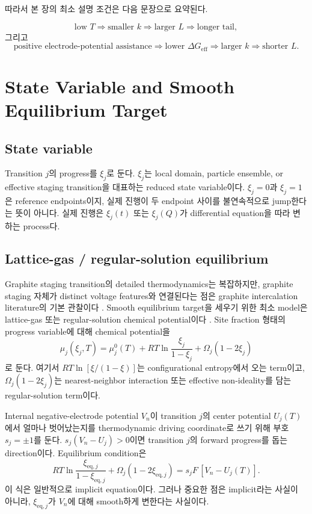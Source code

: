 \documentclass[11pt]{article}
\newcommand{\eq}{\mathrm{eq}}
\newcommand{\eff}{\mathrm{eff}}
\begin{document}
따라서 본 장의 최소 설명 조건은 다음 문장으로 요약된다.

\[
\text{low }T
\Rightarrow
\text{smaller }k
\Rightarrow
\text{larger }L
\Rightarrow
\text{longer tail},
\]
그리고
\[
\text{positive electrode-potential assistance}
\Rightarrow
\text{lower }\Delta G_{\eff}
\Rightarrow
\text{larger }k
\Rightarrow
\text{shorter }L.
\]

\section{State Variable and Smooth Equilibrium Target}\label{sec:equilibrium}

\subsection{State variable}\label{subsec:state}

Transition \(j\)의 progress를 \(\xi_j\)로 둔다. \(\xi_j\)는 local domain, particle ensemble,
or effective staging transition을 대표하는 reduced state variable이다. \(\xi_j=0\)과
\(\xi_j=1\)은 reference endpoints이지, 실제 진행이 두 endpoint 사이를 불연속적으로 jump한다는
뜻이 아니다. 실제 진행은 \(\xi_j(t)\) 또는 \(\xi_j(Q)\)가 differential equation을 따라 변하는
process다.

\subsection{Lattice-gas / regular-solution equilibrium}\label{subsec:lattice}

Graphite staging transition의 detailed thermodynamics는 복잡하지만, graphite staging 자체가
distinct voltage features와 연결된다는 점은 graphite intercalation literature의 기본 관찰이다
\cite{dahn1991,ohzuku1993}. Smooth equilibrium target을
세우기 위한 최소 model은 lattice-gas 또는 regular-solution chemical potential이다
\cite{mckinnon1983,bazant2013}. Site fraction 형태의 progress variable에 대해 chemical
potential을
\begin{equation}
\mu_j(\xi_j,T)
=
\mu_j^0(T)
+RT\ln\frac{\xi_j}{1-\xi_j}
+\Omega_j(1-2\xi_j)
\label{eq:mu_lattice}
\end{equation}
로 둔다. 여기서 \(RT\ln[\xi/(1-\xi)]\)는 configurational entropy에서 오는 term이고,
\(\Omega_j(1-2\xi_j)\)는 nearest-neighbor interaction 또는 effective non-ideality를 담는
regular-solution term이다.

Internal negative-electrode potential \(V_n\)이 transition \(j\)의 center potential
\(U_j(T)\)에서 얼마나 벗어났는지를 thermodynamic driving coordinate로 쓰기 위해 부호
\(s_j=\pm1\)를 둔다. \(s_j(V_n-U_j)>0\)이면 transition \(j\)의 forward progress를 돕는
direction이다. Equilibrium condition은
\begin{equation}
RT\ln\frac{\xi_{\eq,j}}{1-\xi_{\eq,j}}
+\Omega_j(1-2\xi_{\eq,j})
=
s_jF\,[V_n-U_j(T)] .
\label{eq:eq_condition}
\end{equation}
이 식은 일반적으로 implicit equation이다. 그러나 중요한 점은 implicit라는 사실이 아니라,
\(\xi_{\eq,j}\)가 \(V_n\)에 대해 smooth하게 변한다는 사실이다.
\end{document}
